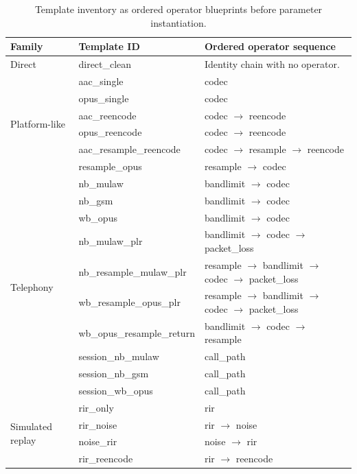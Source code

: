 \begin{table}[t]
\caption{Template inventory as ordered operator blueprints before parameter instantiation.}
\label{tab:appendix_templates}
\centering
\footnotesize
\setlength{\tabcolsep}{2pt}
\renewcommand{\arraystretch}{1.04}
\begin{tabular}{@{}p{}p{}p{}@{}}
\toprule
\textbf{Family} & \textbf{Template ID} & \textbf{Ordered operator sequence} \\
\midrule
Direct & direct\_clean & Identity chain with no operator. \\
\midrule
\multirow[t]{6}{*}{Platform-like} & aac\_single & codec \\
& opus\_single & codec \\
& aac\_reencode & codec $\rightarrow$ reencode \\
& opus\_reencode & codec $\rightarrow$ reencode \\
& aac\_resample\_reencode & codec $\rightarrow$ resample $\rightarrow$ reencode \\
& resample\_opus & resample $\rightarrow$ codec \\
\midrule
\multirow[t]{10}{*}{Telephony} & nb\_mulaw & bandlimit $\rightarrow$ codec \\
& nb\_gsm & bandlimit $\rightarrow$ codec \\
& wb\_opus & bandlimit $\rightarrow$ codec \\
& nb\_mulaw\_plr & bandlimit $\rightarrow$ codec $\rightarrow$ packet\_loss \\
& nb\_resample\_mulaw\_plr & resample $\rightarrow$ bandlimit $\rightarrow$ codec $\rightarrow$ packet\_loss \\
& wb\_resample\_opus\_plr & resample $\rightarrow$ bandlimit $\rightarrow$ codec $\rightarrow$ packet\_loss \\
& wb\_opus\_resample\_return & bandlimit $\rightarrow$ codec $\rightarrow$ resample \\
& session\_nb\_mulaw & call\_path \\
& session\_nb\_gsm & call\_path \\
& session\_wb\_opus & call\_path \\
\midrule
\multirow[t]{7}{*}{Simulated replay} & rir\_only & rir \\
& rir\_noise & rir $\rightarrow$ noise \\
& noise\_rir & noise $\rightarrow$ rir \\
& rir\_reencode & rir $\rightarrow$ reencode \\

\end{tabular}
\end{table}
